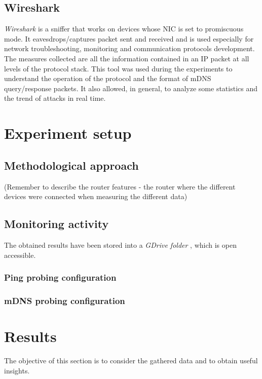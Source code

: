 \documentclass[fleqn, 11pt]{SelfArx} %
\begin{document}
\subsection{Wireshark}
\textit{Wireshark} is a sniffer that works on devices whose NIC is set to promiscuous mode. It eavesdrops/captures packet sent and received and is used especially for network troubleshooting, monitoring and communication protocols development. The measures collected are all the information contained in an IP packet at all levels of the protocol stack. \newline
This tool was used during the experiments to understand the operation of the protocol and the format of mDNS query/response packets. \newline
It also allowed, in general, to analyze some statistics and the trend of attacks in real time.

\section{Experiment setup}
\subsection{Methodological approach}
(Remember to describe the router features - the router where the different devices were connected when measuring the different data)
\subsection{Monitoring activity}
The obtained results have been stored into a {\it{GDrive folder}} \cite{GDrive}, which is open accessible.
\subsubsection{Ping probing configuration}
\subsubsection{mDNS probing configuration}


\section{Results}
The objective of this section is to consider the gathered data and to obtain useful insights.
\end{document}
